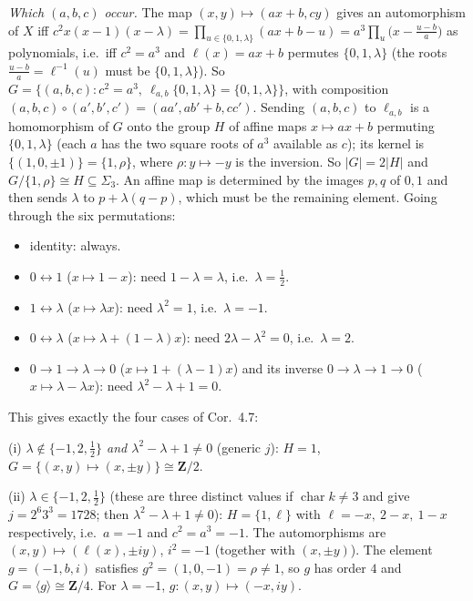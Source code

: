 \documentclass[11pt]{article}
\begin{document}
\emph{Which $(a,b,c)$ occur.} The map $(x,y)\mapsto(ax+b,cy)$ gives an automorphism of $X$ iff $c^2x(x-1)(x-\lambda)=\prod_{u\in\{0,1,\lambda\}}(ax+b-u)=a^3\prod_u\bigl(x-\tfrac{u-b}a\bigr)$ as polynomials, i.e.\ iff $c^2=a^3$ and $\ell(x)=ax+b$ permutes $\{0,1,\lambda\}$ (the roots $\frac{u-b}{a}=\ell^{-1}(u)$ must be $\{0,1,\lambda\}$). So $G=\{(a,b,c):c^2=a^3,\ \ell_{a,b}\{0,1,\lambda\}=\{0,1,\lambda\}\}$, with composition $(a,b,c)\circ(a',b',c')=(aa',ab'+b,cc')$. Sending $(a,b,c)$ to $\ell_{a,b}$ is a homomorphism of $G$ onto the group $H$ of affine maps $x\mapsto ax+b$ permuting $\{0,1,\lambda\}$ (each $a$ has the two square roots of $a^3$ available as $c$); its kernel is $\{(1,0,\pm1)\}=\{1,\rho\}$, where $\rho:y\mapsto -y$ is the inversion. So $|G|=2|H|$ and $G/\{1,\rho\}\cong H\subseteq\Sigma_3$. An affine map is determined by the images $p,q$ of $0,1$ and then sends $\lambda$ to $p+\lambda(q-p)$, which must be the remaining element. Going through the six permutations:
\begin{itemize}
\item identity: always.
\item $0\leftrightarrow1$ ($x\mapsto1-x$): need $1-\lambda=\lambda$, i.e.\ $\lambda=\tfrac12$.
\item $1\leftrightarrow\lambda$ ($x\mapsto\lambda x$): need $\lambda^2=1$, i.e.\ $\lambda=-1$.
\item $0\leftrightarrow\lambda$ ($x\mapsto\lambda+(1-\lambda)x$): need $2\lambda-\lambda^2=0$, i.e.\ $\lambda=2$.
\item $0\to1\to\lambda\to0$ ($x\mapsto1+(\lambda-1)x$) and its inverse $0\to\lambda\to1\to0$ ($x\mapsto\lambda-\lambda x$): need $\lambda^2-\lambda+1=0$.
\end{itemize}
This gives exactly the four cases of Cor.~4.7:

(i) \emph{$\lambda\notin\{-1,2,\tfrac12\}$ and $\lambda^2-\lambda+1\ne0$} (generic $j$): $H=1$, $G=\{(x,y)\mapsto(x,\pm y)\}\cong\mathbf Z/2$.

(ii) \emph{$\lambda\in\{-1,2,\tfrac12\}$} (these are three distinct values if $\operatorname{char}k\ne3$ and give $j=2^6 3^3=1728$; then $\lambda^2-\lambda+1\ne0$): $H=\{1,\ell\}$ with $\ell=-x,\ 2-x,\ 1-x$ respectively, i.e.\ $a=-1$ and $c^2=a^3=-1$. The automorphisms are $(x,y)\mapsto(\ell(x),\pm iy)$, $i^2=-1$ (together with $(x,\pm y)$). The element $g=(-1,b,i)$ satisfies $g^2=(1,0,-1)=\rho\ne1$, so $g$ has order $4$ and $G=\langle g\rangle\cong\mathbf Z/4$. For $\lambda=-1$, $g:(x,y)\mapsto(-x,iy)$.
\end{document}
